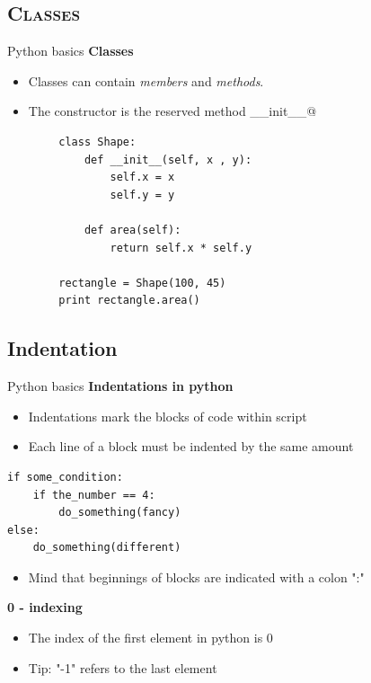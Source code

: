 \documentclass[xcolor=x11names, compress]{beamer}
\renewcommand{\(}{\begin{columns}}
\renewcommand{\)}{\end{columns}}
\newcommand{\<}[1]{\begin{column}{#1}}
\renewcommand{\>}{\end{column}}
\begin{document}
\subsection{\scshape Classes}
\begin{frame}[fragile]{Python basics}
\textbf{Classes}
\begin{itemize}
  \item Classes can contain \emph{members} and \emph{methods}.
  \item The constructor is the reserved method \verb@__init__@
\end{itemize}

\begin{verbatim}
        class Shape:
            def __init__(self, x , y):
                self.x = x
                self.y = y

            def area(self):
                return self.x * self.y

        rectangle = Shape(100, 45)
        print rectangle.area()
\end{verbatim}

\end{frame}

\subsection{Indentation}
\begin{frame}[fragile]{Python basics}
\textbf{Indentations in python}
\begin{itemize}
\item Indentations mark the blocks of code within script 
\item Each line of a block must be indented by the same amount
\end{itemize}

\begin{verbatim}
if some_condition:
    if the_number == 4:
        do_something(fancy)
else:
    do_something(different)
\end{verbatim}

\begin{itemize}
\item Mind that beginnings of blocks are indicated with a colon ":"
\end{itemize}

\pause

\textbf{0 - indexing}
\begin{itemize}
\item The index of the first element in python is 0
\item Tip: "-1" refers to the last element 
\end{itemize}
\end{frame}
\end{document}
